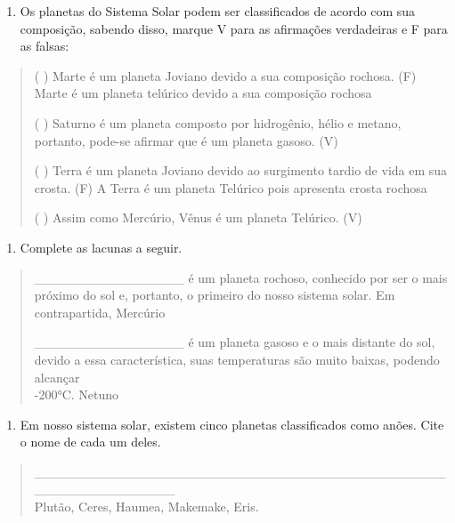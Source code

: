 \begin{enumerate}
\def\labelenumi{\arabic{enumi}.}
\item
  Os planetas do Sistema Solar podem ser classificados de acordo com sua
  composição, sabendo disso, marque V para as afirmações verdadeiras e F
  para as falsas:
\end{enumerate}

\begin{quote}
( ) Marte é um planeta Joviano devido a sua composição rochosa. (F)
Marte é um planeta telúrico devido a sua composição rochosa

( ) Saturno é um planeta composto por hidrogênio, hélio e metano,
portanto, pode-se afirmar que é um planeta gasoso. (V)

( ) Terra é um planeta Joviano devido ao surgimento tardio de vida em
sua crosta. (F) A Terra é um planeta Telúrico pois apresenta crosta
rochosa

( ) Assim como Mercúrio, Vênus é um planeta Telúrico. (V)
\end{quote}

\begin{enumerate}
\def\labelenumi{\arabic{enumi}.}
\item
  Complete as lacunas a seguir.
\end{enumerate}

\begin{quote}
\_\_\_\_\_\_\_\_\_\_\_\_\_\_\_\_ é um planeta rochoso, conhecido por ser
o mais próximo do sol e, portanto, o primeiro do nosso sistema solar. Em
contrapartida, Mercúrio

\_\_\_\_\_\_\_\_\_\_\_\_\_\_\_\_ é um planeta gasoso e o mais distante
do sol, devido a essa característica, suas temperaturas são muito
baixas, podendo alcançar\\
-200°C. Netuno
\end{quote}

\begin{enumerate}
\def\labelenumi{\arabic{enumi}.}
\item
  Em nosso sistema solar, existem cinco planetas classificados como
  anões. Cite o nome de cada um deles.
\end{enumerate}

\begin{quote}
\_\_\_\_\_\_\_\_\_\_\_\_\_\_\_\_\_\_\_\_\_\_\_\_\_\_\_\_\_\_\_\_\_\_\_\_\_\_\_\_\_\_\_\_\_\_\_\_\_\_\_\_\_\_\_\_\_\_\_\\
Plutão, Ceres, Haumea, Makemake, Eris.
\end{quote}

